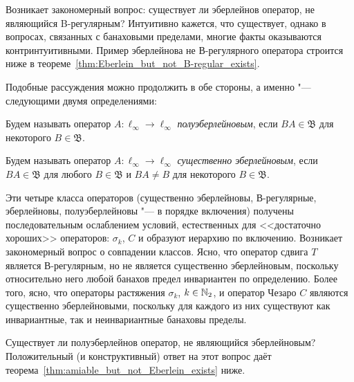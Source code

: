 Возникает закономерный вопрос: существует ли эберлейнов оператор, не являющийся B-регулярным?
Интуитивно кажется, что существует, однако в вопросах, связанных с банаховыми пределами,
многие факты оказываются контринтуитивными.
Пример эберлейнова не В-регулярного оператора строится ниже
в теореме~\ref{thm:Eberlein_but_not_B-regular_exists}.

Подобные рассуждения можно продолжить в обе стороны, а именно "--- следующими двумя определениями:

\begin{definition}
	Будем называть оператор $A:\ell_\infty \to \ell_\infty$ \emph{полуэберлейновым}, если $BA\in\mathfrak B$ для некоторого $B\in\mathfrak B$.
\end{definition}

\begin{definition}
	Будем называть оператор $A:\ell_\infty \to \ell_\infty$ \emph{существенно эберлейновым}, если $BA\in\mathfrak B$ для любого $B\in\mathfrak B$ и $BA\ne B$ для некоторого $B\in\mathfrak B$.
\end{definition}

Эти четыре класса операторов (существенно эберлейновы, В-регулярные, эберлейновы, полуэберлейновы "--- в порядке включения)
получены последовательным ослаблением условий, естественных для <<достаточно хороших>> операторов:
$\sigma_k$, $C$
и образуют иерархию по включению.
Возникает закономерный вопрос о совпадении классов.
Ясно, что оператор сдвига $T$ является В-регулярным, но не является существенно эберлейновым, поскольку относительно него любой банахов предел инвариантен по определению.
Более того, ясно, что операторы растяжения $\sigma_k$, $k\in\mathbb{N}_2$, и оператор Чезаро $C$ являются существенно эберлейновыми,
поскольку для каждого из них существуют как инвариантные, так и неинвариантные банаховы пределы.

Существует ли полуэберлейнов оператор, не являющийся эберлейновым?
Положительный (и конструктивный) ответ на этот вопрос даёт теорема~\ref{thm:amiable_but_not_Eberlein_exists} ниже.




%
%

